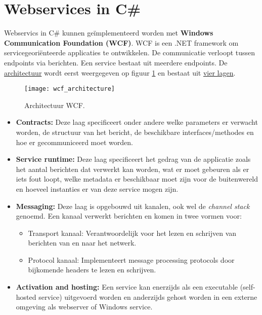 \documentclass{report}
\begin{document}
\section{Webservices in C\#}
Webservics in C\# kunnen geïmplementeerd worden met \textbf{Windows Communication Foundation (WCF)}. WCF is een .NET framework om servicegeoriënteerde applicaties te ontwikkelen. De communicatie verloopt tussen endpoints via berichten. Een service bestaat uit meerdere endpoints. De \underline{architectuur} wordt eerst weergegeven op figuur \ref{fig:wcf_architecture} en bestaat uit \underline{vier lagen}.
\begin{figure}[ht]
	\centering
	\texttt{[image: wcf\_architecture]}
	\caption{Architectuur WCF.}
	\label{fig:wcf_architecture}
\end{figure}
\begin{itemize}
	\item[\info] \textbf{Contracts:} Deze laag specificeert onder andere welke parameters er verwacht worden, de structuur van het bericht, de beschikbare interfaces/methodes en hoe er gecommuniceerd moet worden.
	\item[\info] \textbf{Service runtime:} Deze laag specificeert het gedrag van de applicatie zoals het aantal berichten dat verwerkt kan worden, wat er moet gebeuren als er iets fout loopt, welke metadata er beschikbaar moet zijn voor de buitenwereld en hoeveel instanties er van deze service mogen zijn.
	\item[\info] \textbf{Messaging:} Deze laag is opgebouwd uit kanalen, ook wel de \emph{channel stack} genoemd. Een kanaal verwerkt berichten en komen in twee vormen voor:
	\begin{itemize}
		\item Transport kanaal: Verantwoordelijk voor het lezen en schrijven van berichten van en naar het netwerk.
		\item Protocol kanaal: Implementeert message processing protocols door bijkomende headers te lezen en schrijven.
	\end{itemize}
	\item[\info] \textbf{Activation and hosting:} Een service kan enerzijds als een executable (self-hosted service) uitgevoerd worden en anderzijds gehost worden in een externe omgeving als webserver of Windows service.
\end{itemize}
\end{document}
